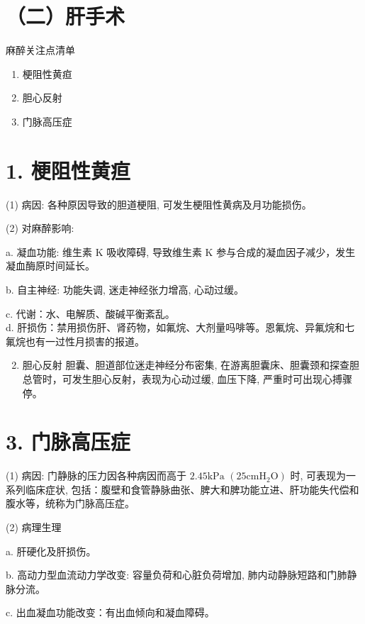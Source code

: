 \documentclass[10pt]{article}
\begin{document}
\section*{（二）肝手术}
麻醉关注点清单

\begin{enumerate}
  \item 梗阻性黄疸

  \item 胆心反射

  \item 门脉高压症

\end{enumerate}

\section*{1. 梗阻性黄疸}
(1) 病因: 各种原因导致的胆道梗阻, 可发生梗阻性黄病及月功能损伤。

(2) 对麻醉影响:

a. 凝血功能: 维生素 $\mathrm{K}$ 吸收障碍, 导致维生素 $\mathrm{K}$ 参与合成的凝血因子减少，发生凝血酶原时间延长。

b. 自主神经: 功能失调, 迷走神经张力增高, 心动过缓。

c. 代谢：水、电解质、酸碱平衡紊乱。\\
d. 肝损伤：禁用损伤肝、肾药物，如氟烷、大剂量吗啡等。恩氟烷、异氟烷和七氟烷也有一过性月损害的报道。

\begin{enumerate}
  \setcounter{enumi}{1}
  \item 胆心反射 胆囊、胆道部位迷走神经分布密集, 在游离胆囊床、胆囊颈和探查胆总管时，可发生胆心反射，表现为心动过缓, 血压下降, 严重时可出现心搏骤停。
\end{enumerate}

\section*{3. 门脉高压症}
(1) 病因: 门静脉的压力因各种病因而高于 $2.45 \mathrm{kPa}$ $\left(25 \mathrm{cmH}_{2} \mathrm{O}\right)$ 时, 可表现为一系列临床症状, 包括：腹壁和食管静脉曲张、脾大和脾功能立进、肝功能失代偿和腹水等，统称为门脉高压症。

(2) 病理生理

a. 肝硬化及肝损伤。

b. 高动力型血流动力学改变: 容量负荷和心脏负荷增加, 肺内动静脉短路和门肺静脉分流。

c. 出血凝血功能改变：有出血倾向和凝血障碍。
\end{document}
